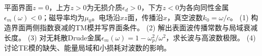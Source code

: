 平面界面\(z=0\)，上方\(z>0\)为无损介质\(\epsilon_d>0\)，下方\(z<0\)为各向同性金属\(\epsilon_m(\omega)<0\)；磁导率均为\(\mu_0\)。电场沿\(xz\)面，传播沿\(x\)，真空波数\(k_0=\omega/c\)。
(1) 构造界面两侧指数衰减的TM模并写界面条件。
(2) 解出表面波传播常数与局域衰减长度。
(3) 对无耗散Drude金属\(\epsilon_m(\omega)=1-\omega_p^2/\omega^2\)，求长波与高波数极限。
(4) 讨论TE模的缺失、能量局域和小损耗对波数的影响。
